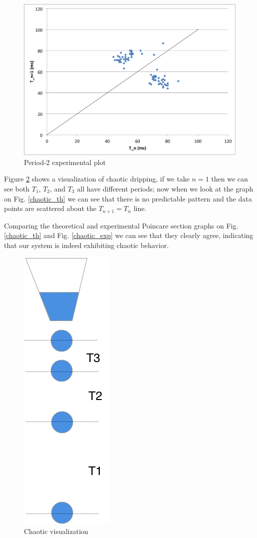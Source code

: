 \documentclass[11pt]{article}
\begin{document}
\newpage
\begin{figure}[htp]
\begin{center}
\includegraphics[width=6in]{figs/period_doubling}
\caption{ Period-2 experimental plot}
\label{period_doubling_exp}
\end{center}
\end{figure}

\newpage
Figure \ref{chaotic_schematic} shows a visualization of chaotic dripping, if we take $n = 1$ then we can see both $T_1$, $T_2$, and $T_3$ all have different periods; now when we look at the graph on Fig. \ref{chaotic_th} we can see that there is no predictable pattern and the data points are scattered about the $T_{n+1} = T_n$ line.

Comparing the theoretical and experimental Poincare section graphs on Fig. \ref{chaotic_th} and Fig. \ref{chaotic_exp} we can see that they clearly agree, indicating that our system is indeed exhibiting chaotic behavior.

\newpage
\begin{figure}[htp]
\begin{center}
\includegraphics[width=.7in]{figs/chaotic_schematic}
\caption{ Chaotic visualization}
\label{chaotic_schematic}
\end{center}
\end{figure}
\end{document}
